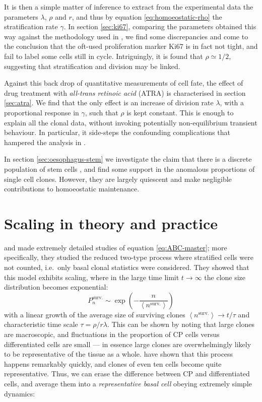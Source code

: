\documentclass[10pt,english]{report}
\begin{document}
It is then a simple matter of inference to extract from the experimental data the parameters $\lambda$, $\rho$ and $r$, and thus by equation \eqref{eq:homoeostatic-rho} the stratification rate $\gamma$. In section \ref{sec:ki67}, comparing the parameters obtained this way against the methodology used in \citet{clayton}, we find some discrepancies and come to the conclusion that the oft-used proliferation marker Ki67 is in fact not tight, and fail to label some cells still in cycle. Intriguingly, it is found that $\rho \simeq 1/2$, suggesting that stratification and division may be linked.

Against this back drop of quantitative measurements of cell fate, the effect of drug treatment with \emph{all-trans retinoic acid} (ATRA) is characterised in section \ref{sec:atra}. We find that the only effect is an increase of division rate $\lambda$, with a proportional response in $\gamma$, such that $\rho$ is kept constant. This is enough to explain all the clonal data, without invoking potentially non-equilibrium transient behaviour. In particular, it side-steps the confounding complications that hampered the analysis in \citet[][chapter 4]{kleinthesis}.

In section \ref{sec:oesophagus-stem} we investigate the claim that there is a discrete population of stem cells \citep{kabalis}, and find some support in the anomalous proportions of single cell clones. However, they are largely quiescent and make negligible contributions to homoeostatic maintenance.

\section{\label{sec:oesophagus-scaling}Scaling in theory and practice}

\citet{klein07} and \citet{tediousharvard} made extremely detailed studies of equation \eqref{eq:ABC-master}; more specifically, they studied the reduced two-type process where stratified cells were not counted, i.e.\ only basal clonal statistics were considered. They showed that this model exhibits scaling, where in the large time limit $t\rightarrow\infty$ the clone size distribution becomes exponential: $$P^\textrm{surv.}_n \sim \exp\left(-\frac{n}{\left\langle n^\textrm{surv.} \right\rangle}\right)$$ with a linear growth of the average size of surviving clones $\left\langle n^\textrm{surv.} \right\rangle \rightarrow t/\tau$ and characteristic time scale $\tau = \rho/r\lambda$. This can be shown by noting that large clones are macroscopic, and fluctuations in the proportion of CP cells versus differentiated cells are small --- in essence large clones are overwhelmingly likely to be representative of the tissue as a whole. \citealt{tediousharvard} have shown that this process happens remarkably quickly, and clones of even ten cells become quite representative. Thus, we can erase the difference between CP and differentiated cells, and average them into a \emph{representative basal cell} obeying extremely simple dynamics: 
\end{document}
